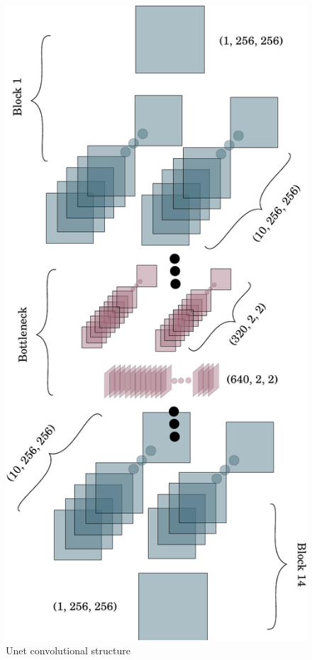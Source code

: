 \documentclass[11pt,a4paper]{report}
\begin{document}
\begin{multicols*}{2}
\begin{table}[H]
\begin{small}
\begin{center}
\begin{tabular}[c]{l|l}
                    \hline
                \end{tabular}
            \end{center}
        \end{small}
    \end{table}

    \begin{figure}[H]
        \centering
        \includegraphics[width = .8\linewidth,page=1]{figure/drawing.pdf}
        \caption{Unet convolutional structure}
    \end{figure}


\end{multicols*}
\end{document}
